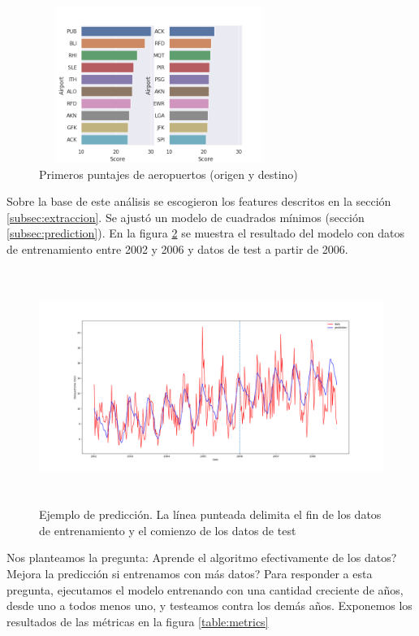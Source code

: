 \begin{figure}[hbtp]
  \centering
  \includegraphics[width=0.7\textwidth, height=2in]{plots/airport_scores_2008.png}
  \caption{Primeros puntajes de aeropuertos (origen y destino)}
  \label{fig:airport_scores}
\end{figure}

Sobre la base de este an\'alisis se escogieron los features descritos en la secci\'on \ref{subsec:extraccion}.
Se ajust\'o un modelo de cuadrados m\'inimos (secci\'on \ref{subsec:prediction}).
En la figura \ref{fig:example_fit_prediction} se muestra el resultado del modelo con datos de entrenamiento
entre 2002 y 2006 y datos de test a partir de 2006.

\begin{figure}[hbtp]
  \centering
  \includegraphics[width=\textwidth, height=3in]{plots/example_fit_and_prediction.png}
  \caption{Ejemplo de predicci\'on. La l\'inea punteada delimita el fin de los datos de
  entrenamiento y el comienzo de los datos de test}
  \label{fig:example_fit_prediction}
\end{figure}

Nos planteamos la pregunta: \textquestiondown Aprende el algoritmo efectivamente de los datos? \textquestiondown Mejora la predicci\'on si
entrenamos con m\'as datos? Para responder a esta pregunta, ejecutamos el modelo entrenando con una cantidad
creciente de a\~nos, desde uno a todos menos uno, y testeamos contra los dem\'as a\~nos. Exponemos
los resultados de las m\'etricas en la figura \ref{table:metrics}

